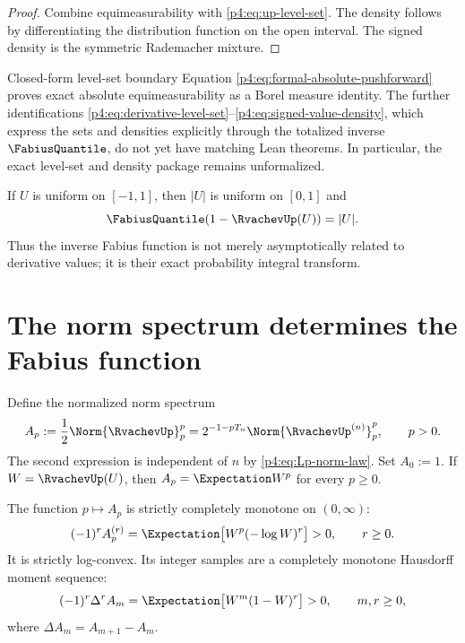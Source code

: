 \documentclass[11pt,oneside]{article}
\theoremstyle{definition}
\theoremstyle{remark}
\begin{document}
\begin{proof}
Combine equimeasurability with \eqref{p4:eq:up-level-set}.  The density follows by
differentiating the distribution function on the open interval.  The signed density is the
symmetric Rademacher mixture.
\end{proof}

\begin{statusbox}{Closed-form level-set boundary}
Equation \eqref{p4:eq:formal-absolute-pushforward} proves exact absolute equimeasurability as
a Borel measure identity.  The further identifications
\eqref{p4:eq:derivative-level-set}--\eqref{p4:eq:signed-value-density}, which express the sets
and densities explicitly through the totalized inverse \(\FabiusQuantile\), do
not yet have matching Lean
theorems.  In particular, the exact level-set and density package remains unformalized.
\end{statusbox}

\begin{remark}
If $U$ is uniform on $[-1,1]$, then $|U|$ is uniform on $[0,1]$ and
\begin{equation}
 \FabiusQuantile\!\left(1-\RvachevUp(U)\right)=|U|.
 \label{p4:eq:quantile-coupling}
\end{equation}
Thus the inverse Fabius function is not merely asymptotically related to derivative values;
it is their exact probability integral transform.
\end{remark}

\section{The norm spectrum determines the Fabius function}
\label{p4:sec:hausdorff}

Define the normalized norm spectrum
\begin{equation}
 A_p:=\frac12\Norm{\RvachevUp}_p^p
 =2^{-1-pT_n}\Norm{\RvachevUp^{(n)}}_p^p,
 \qquad p>0.
 \label{p4:eq:Ap-definition}
\end{equation}
The second expression is independent of $n$ by \eqref{p4:eq:Lp-norm-law}.
Set $A_0:=1$.  If $W=\RvachevUp(U)$, then $A_p=\Expectation W^p$ for every $p\geq0$.

\begin{proposition}
\label{p4:prop:complete-monotonicity}
The function $p\mapsto A_p$ is strictly completely monotone on $(0,\infty)$:
\begin{equation}
 (-1)^rA_p^{(r)}
 =\Expectation\bigl[W^p(-\log W)^r\bigr]>0,
 \qquad r\geq0.
 \label{p4:eq:continuous-complete-monotonicity}
\end{equation}
It is strictly log-convex.  Its integer samples are a completely monotone Hausdorff moment
sequence:
\begin{equation}
 (-1)^r\Delta^r A_m
 =\Expectation\bigl[W^m(1-W)^r\bigr]>0,
 \qquad m,r\geq0,
 \label{p4:eq:discrete-complete-monotonicity}
\end{equation}
where $\Delta A_m=A_{m+1}-A_m$.
\end{proposition}
\end{document}

